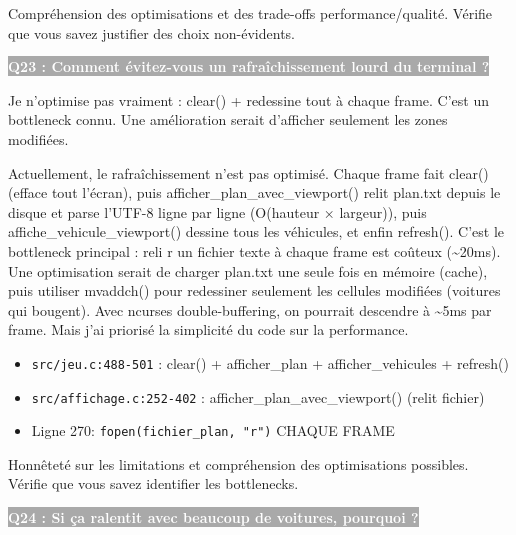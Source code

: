 \documentclass[12pt,a4paper]{article}
\newcommand{\question}[1]{%
    \vspace{0.5cm}
    \noindent\colorbox{darkgray}{\textcolor{white}{\textbf{#1}}}
    \vspace{0.3cm}
}
\begin{document}
\begin{objectif_prof}
Compréhension des optimisations et des trade-offs performance/qualité. Vérifie que vous savez justifier des choix non-évidents.
\end{objectif_prof}

\question{Q23 : Comment évitez-vous un rafraîchissement lourd du terminal ?}

\begin{reponse_courte}
Je n'optimise pas vraiment : clear() + redessine tout à chaque frame. C'est un bottleneck connu. Une amélioration serait d'afficher seulement les zones modifiées.
\end{reponse_courte}

\begin{reponse_longue}
Actuellement, le rafraîchissement n'est pas optimisé. Chaque frame fait clear() (efface tout l'écran), puis afficher\_plan\_avec\_viewport() relit plan.txt depuis le disque et parse l'UTF-8 ligne par ligne (O(hauteur × largeur)), puis affiche\_vehicule\_viewport() dessine tous les véhicules, et enfin refresh(). C'est le bottleneck principal : reli r un fichier texte à chaque frame est coûteux (\textasciitilde{}20ms). Une optimisation serait de charger plan.txt une seule fois en mémoire (cache), puis utiliser mvaddch() pour redessiner seulement les cellules modifiées (voitures qui bougent). Avec ncurses double-buffering, on pourrait descendre à \textasciitilde{}5ms par frame. Mais j'ai priorisé la simplicité du code sur la performance.
\end{reponse_longue}

\begin{reference_code}
\begin{itemize}
    \item \texttt{src/jeu.c:488-501} : clear() + afficher\_plan + afficher\_vehicules + refresh()
    \item \texttt{src/affichage.c:252-402} : afficher\_plan\_avec\_viewport() (relit fichier)
    \item Ligne 270: \texttt{fopen(fichier\_plan, "r")} CHAQUE FRAME
\end{itemize}
\end{reference_code}

\begin{objectif_prof}
Honnêteté sur les limitations et compréhension des optimisations possibles. Vérifie que vous savez identifier les bottlenecks.
\end{objectif_prof}

\question{Q24 : Si ça ralentit avec beaucoup de voitures, pourquoi ?}
\end{document}
